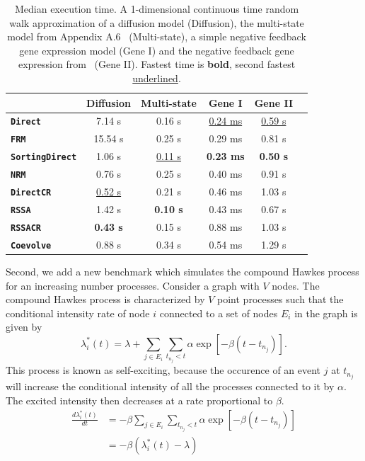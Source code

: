 \documentclass{juliacon}
\begin{document}
\begin{table}
\centering
\begin{tabular}{lccccc}
\toprule
 & \multicolumn{1}{c}{\textbf{ Diffusion }} & \multicolumn{1}{c}{\textbf{ Multi-state }} & \multicolumn{1}{c}{\textbf{ Gene I }} & \multicolumn{1}{c}{\textbf{ Gene II }} \\
\hline
\textbf{\texttt{Direct}}         & 7.14 s             & 0.16 s             & \underline{0.24 ms} & \underline{0.59 s} \\
\textbf{\texttt{FRM}}            & 15.54 s            & 0.25 s             & 0.29 ms             & 0.81 s             \\
\textbf{\texttt{SortingDirect}}  & 1.06 s             & \underline{0.11 s} & \textbf{0.23 ms}    & \textbf{0.50 s}    \\
\textbf{\texttt{NRM}}            & 0.76 s             & 0.25 s             & 0.40 ms             & 0.91 s             \\
\textbf{\texttt{DirectCR}}       & \underline{0.52 s} & 0.21 s             & 0.46 ms             & 1.03 s             \\
\textbf{\texttt{RSSA}}           & 1.42 s             & \textbf{0.10 s}    & 0.43 ms             & 0.67 s             \\
\textbf{\texttt{RSSACR}}         & \textbf{0.43 s}    & 0.15 s             & 0.88 ms             & 1.03 s             \\
\textbf{\texttt{Coevolve}}       & 0.88 s             & 0.34 s             & 0.54 ms             & 1.29 s             \\
\bottomrule
\end{tabular}
\caption{Median execution time. A 1-dimensional continuous time random walk approximation of a diffusion model (Diffusion), the multi-state model from Appendix A.6~\cite{marchetti2017} (Multi-state), a simple negative feedback gene expression model (Gene I) and the negative feedback gene expression from~\cite{gupta2018} (Gene II). Fastest time is \textbf{bold}, second fastest \underline{underlined}.}
\label{tab:benchmark-biochemistry}
\end{table}

Second, we add a new benchmark which simulates the compound Hawkes process for an increasing number processes. Consider a graph with \( V \) nodes. The compound Hawkes process is characterized by \( V \) point processes such that the conditional intensity rate of node \( i \) connected to a set of nodes \( E_i \) in the graph is given by
\[
  \lambda_i^\ast (t) = \lambda + \sum_{j \in E_i} \sum_{t_{n_j} < t} \alpha \exp \left[-\beta (t - t_{n_j}) \right].
\]
This process is known as self-exciting, because the occurence of an event \( j \) at \( t_{n_j} \) will increase the conditional intensity of all the processes connected to it by \( \alpha \). The excited intensity then decreases at a rate proportional to \( \beta \).
\[
\begin{split}
  \frac{d \lambda_i^\ast (t)}{d t}
    &= -\beta \sum_{j \in E_i} \sum_{t_{n_j} < t} \alpha \exp \left[-\beta (t - t_{n_j}) \right] \\
    &= -\beta \left( \lambda_i^\ast (t) - \lambda \right)
\end{split}
\]
\end{document}
